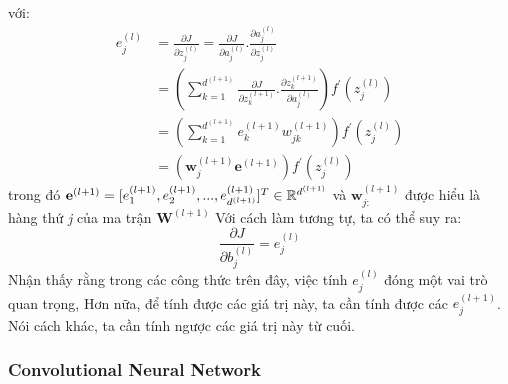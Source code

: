 với:
\begin{align*}
e_{j}^{(l)} &= \frac{\partial J}{\partial z_{j}^{(l)}}= \frac{\partial J}{\partial a_{j}^{(l)}}.\frac{\partial a_{j}^{(l)}}{\partial z_{j}^{(l)}}\\
& = (\sum_{k=1}^{d^{(l+1)}}\frac{\partial J}{\partial z_{k}^{(l+1)}}.\frac{\partial z_{k}^{(l+1)}}{\partial a_{j}^{(l)}})f^{'}(z_{j}^{(l)})\\
& = (\sum_{k=1}^{d^{(l+1)}}e_{k}^{(l+1)}w_{jk}^{(l+1)})f^{'}(z_{j}^{(l)})\\
& = (\textbf{w}_j^{(l+1)}\textbf{e}^{(l+1)})f^{'}(z_{j}^{(l)})
\end{align*}
trong đó $\textbf{e}^{(l+1)}=[e_{1}^{(l+1)},e_{2}^{(l+1)},...,e_{d^{(l+1)}}^{(l+1)}]^T \in \mathbb{R}^{d^{(l+1)}\time 1}$ và $\textbf{w}_{j:}^{(l+1)}$ được hiểu là hàng thứ \textit{j} của ma trận $\textbf{W}^{(l+1)}$
Với cách làm tương tự, ta có thể suy ra:
\begin{equation*}
\frac{\partial J}{\partial b_{j}^{(l)}} = e_j^{(l)}
\end{equation*}
Nhận thấy rằng trong các công thức trên đây, việc tính $e_j^{(l)}$ đóng một vai trò quan trọng, Hơn nữa, để tính được các giá trị này, ta cần tính được các $e_j^{(l+1)}$. Nói cách khác, ta cần tính ngược các giá trị này từ cuối.
\subsubsection{Convolutional Neural Network}

